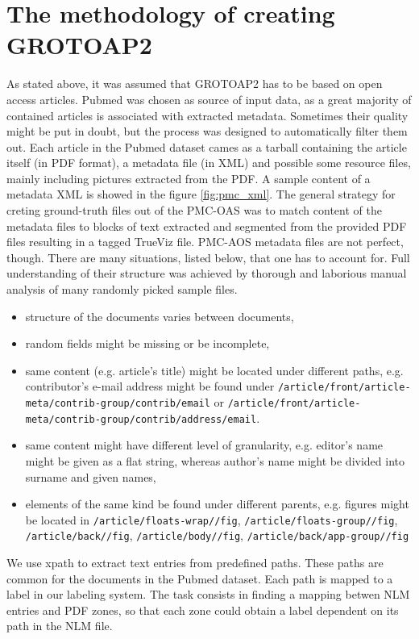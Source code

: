 \section{The methodology of creating GROTOAP2}
As stated above, it was assumed that GROTOAP2 has to be based on open access articles. Pubmed was chosen as source of input data, as a great majority of contained articles is associated with extracted metadata. Sometimes their quality might be put in doubt, but the process was designed to automatically filter them out.
\qquad
Each article in the Pubmed dataset cames as a tarball containing the article itself (in PDF format), a metadata file (in XML) and possible some resource files, mainly including pictures extracted from the PDF. A sample content of a metadata XML is showed in the figure \ref{fig:pmc_xml}.
The general strategy for creting ground-truth files out of the PMC-OAS was to match content of the metadata files to blocks of text extracted and segmented from the provided PDF files resulting in a tagged TrueViz file. PMC-AOS metadata files are not perfect, though. There are many situations, listed below, that one has to account for. Full understanding of their structure was achieved by thorough and laborious manual analysis of many randomly picked sample files.
\begin{itemize}
\item structure of the documents varies between documents,
\item random fields might be missing or be incomplete,
\item same content (e.g. article's title) might be located under different paths, e.g. contributor's e-mail address might be found under \verb+/article/front/article-meta/contrib-group/contrib/email+ or \verb+/article/front/article-meta/contrib-group/contrib/address/email+.
\item same content might have different level of granularity, e.g. editor's name might be given as a flat string, whereas author's name might be divided into surname and given names,
\item elements of the same kind be found under different parents, e.g. figures might be located in \verb+/article/floats-wrap//fig+, \verb+/article/floats-group//fig+, \verb+/article/back//fig+, \verb+/article/body//fig+, \verb+/article/back/app-group//fig+

\end{itemize}

We use xpath to extract text entries from predefined paths. These paths are common for the documents in the Pubmed dataset. Each path is mapped to a label in our labeling system. The task consists in finding a mapping betwen NLM entries and PDF zones, so that each zone could obtain a label dependent on its path in the NLM file.

